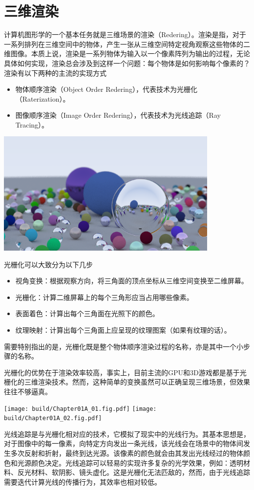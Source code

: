 \chapter{三维渲染}

计算机图形学的一个基本任务就是三维场景的渲染（Redering）。渲染是指，对于一系列排列在三维空间中的物体，产生一张从三维空间特定视角观察这些物体的二维图像。本质上说，渲染是一系列物体为输入以一个像素阵列为输出的过程，无论具体如何实现，渲染总会涉及到这样一个问题：每个物体是如何影响每个像素的？渲染有以下两种的主流的实现方式
\begin{itemize}
    \item 物体顺序渲染（Object Order Redering），代表技术为光栅化（Raterization）。
    \item 图像顺序渲染（Image Order Redering），代表技术为光线追踪（Ray Tracing）。
\end{itemize}

\begin{Figure}
    \includegraphics[width=11cm]{image/Final.png}
\end{Figure}

光栅化可以大致分为以下几步
\begin{itemize}
    \item 视角变换：根据观察方向，将三角面的顶点坐标从三维空间变换至二维屏幕。
    \item 光栅化：计算二维屏幕上的每个三角形应当占用哪些像素。
    \item 表面着色：计算出每个三角面在光照下的颜色。
    \item 纹理映射：计算出每个三角面上应呈现的纹理图案（如果有纹理的话）。
\end{itemize}
需要特别指出的是，光栅化既是整个物体顺序渲染过程的名称，亦是其中一个小步骤的名称。\goodbreak

光栅化的优势在于渲染效率较高，事实上，目前主流的GPU和3D游戏都是基于光栅化的三维渲染技术。然而，这种简单的变换虽然可以正确呈现三维场景，但效果往往不够逼真。

\begin{Figure}
    \texttt{[image: build/Chapter01A\_01.fig.pdf]}
    \texttt{[image: build/Chapter01A\_02.fig.pdf]}
\end{Figure}

光线追踪是与光栅化相对应的技术，它模拟了现实中的光线行为。其基本思想是，对于图像中的每一像素，向特定方向发出一条光线，该光线会在场景中的物体间发生多次反射和折射，最终到达光源。该像素的颜色就会由其发出光线经过的物体颜色和光源颜色决定。光线追踪可以轻易的实现许多复杂的光学效果，例如：透明材料、反光材料、软阴影、镜头虚化。这是光栅化无法匹敌的，然而，由于光线追踪需要迭代计算光线的传播行为，其效率也相对较低。